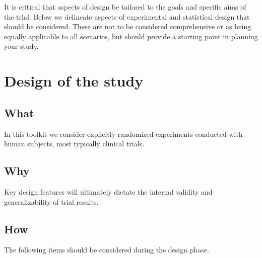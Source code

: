 \documentclass[]{book}
\theoremstyle{definition}
\theoremstyle{definition}
\theoremstyle{definition}
\theoremstyle{remark}
\begin{document}
It is critical that aspects of design be tailored to the goals and
specific aims of the trial. Below we delineate aspects of experimental
and statistical design that should be considered. These are not to be
considered comprehensive or as being equally applicable to all
scenarios, but should provide a starting point in planning your study.

\section{Design of the study}\label{design-of-the-study}

\subsection{What}\label{what-1}

In this toolkit we consider explicitly randomized experiments conducted
with human subjects, most typically clinical trials.

\subsection{Why}\label{why-1}

Key design features will ultimately dictate the internal validity and
generalizability of trial results.

\subsection{How}\label{how-1}

The following items should be considered during the design phase.
\end{document}
